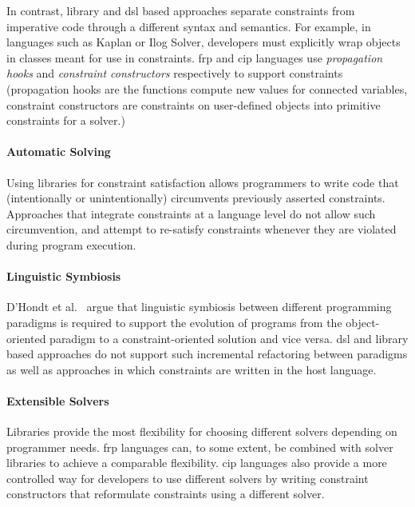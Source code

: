 In contrast, library and \ac{dsl} based approaches separate
constraints from imperative code through a different syntax and
semantics. For example, in languages such as Kaplan or Ilog Solver,
developers must explicitly wrap objects in classes meant for use in
constraints. \DIFdelbegin %
\DIFdelend \DIFaddbegin \Ac{frp} \DIFaddend and \ac{cip} languages use \emph{propagation
  hooks} and \emph{constraint constructors} respectively to support
constraints (propagation hooks are the functions \DIFaddbegin {}\DIFaddend compute new
values for connected variables, \DIFaddbegin {}\DIFaddend constraint constructors are 
\DIFdelbegin {}\DIFdelend \DIFaddbegin {}\DIFaddend constraints on user-defined objects
into primitive constraints for a solver.)

\paragraph{Automatic Solving}
Using libraries for constraint satisfaction allows programmers to
write code that (intentionally or unintentionally) circumvents
previously asserted constraints. Approaches that integrate constraints
at a language level do not allow such circumvention, and attempt to
re-satisfy constraints whenever they are violated during program
execution.

\paragraph{Linguistic Symbiosis}
D'Hondt et al.~\cite{d2004seamless} argue that linguistic symbiosis
between different programming paradigms is required to support the
evolution of programs from the object-oriented paradigm to a
constraint-oriented solution and vice versa. \ac{dsl} and library
based approaches do not support such incremental refactoring between
paradigms as well as approaches in which constraints are written in the
host language.

\paragraph{Extensible Solvers}
Libraries provide the most flexibility for choosing different solvers
depending on programmer needs. \DIFdelbegin %
\DIFdelend \DIFaddbegin \Ac{frp} \DIFaddend languages can, to some extent,
be combined with solver libraries to achieve a comparable
flexibility. \ac{cip} languages also provide a more controlled way for
developers to use different solvers by writing constraint constructors
that reformulate constraints using a different solver.

